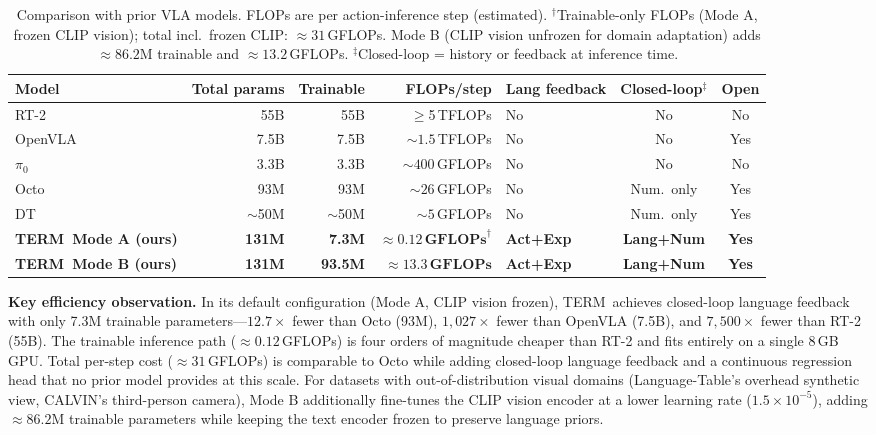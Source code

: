 \documentclass{article}
\newcommand{\modelname}{\textsc{TERM}\xspace}
\begin{document}
\begin{table}[h]
\centering
\caption{Comparison with prior VLA models.
  FLOPs are per action-inference step (estimated).
  $^\dagger$Trainable-only FLOPs (Mode A, frozen CLIP vision); total incl.\ frozen CLIP: ${\approx}31$\,GFLOPs.
  Mode B (CLIP vision unfrozen for domain adaptation) adds ${\approx}86.2$M trainable and ${\approx}13.2$\,GFLOPs.
  $^\ddagger$Closed-loop = history or feedback at inference time.}
\label{tab:comparison}
\small
\setlength{\tabcolsep}{4pt}
\begin{tabular}{lrrrlcc}
\toprule
\textbf{Model} & \textbf{Total params} & \textbf{Trainable} & \textbf{FLOPs/step}
               & \textbf{Lang feedback} & \textbf{Closed-loop$^\ddagger$} & \textbf{Open} \\
\midrule
RT-2~\citep{brohan2023rt2}     & 55B  & 55B   & $\ge$5\,TFLOPs   & No  & No          & No  \\
OpenVLA~\citep{kim2024openvla} & 7.5B & 7.5B  & ${\sim}1.5$\,TFLOPs & No & No        & Yes \\
$\pi_0$~\citep{black2024pi0}   & 3.3B & 3.3B  & ${\sim}400$\,GFLOPs & No & No        & No  \\
Octo~\citep{octo2024}          & 93M  & 93M   & ${\sim}26$\,GFLOPs  & No & Num.\ only & Yes \\
DT~\citep{chen2021decision}    & ${\sim}$50M & ${\sim}$50M & ${\sim}5$\,GFLOPs & No & Num.\ only & Yes \\
\midrule
\textbf{\modelname\ Mode A (ours)} & \textbf{131M} & \textbf{7.3M}
                               & $\mathbf{{\approx}0.12\,\text{GFLOPs}}^\dagger$
                               & \textbf{Act+Exp} & \textbf{Lang+Num} & \textbf{Yes} \\
\textbf{\modelname\ Mode B (ours)} & \textbf{131M} & \textbf{93.5M}
                               & $\mathbf{{\approx}13.3\,\text{GFLOPs}}$
                               & \textbf{Act+Exp} & \textbf{Lang+Num} & \textbf{Yes} \\
\bottomrule
\end{tabular}
\end{table}

\noindent\textbf{Key efficiency observation.}
In its default configuration (Mode A, CLIP vision frozen), \modelname\ achieves
closed-loop language feedback with only 7.3M trainable parameters---$12.7\times$
fewer than Octo (93M), $1{,}027\times$ fewer than OpenVLA (7.5B), and
$7{,}500\times$ fewer than RT-2 (55B).
The trainable inference path (${\approx}0.12$\,GFLOPs) is four orders of
magnitude cheaper than RT-2 and fits entirely on a single 8\,GB GPU.
Total per-step cost (${\approx}31$\,GFLOPs) is comparable to Octo while adding
closed-loop language feedback and a continuous regression head that no prior
model provides at this scale.
For datasets with out-of-distribution visual domains (Language-Table's
overhead synthetic view, CALVIN's third-person camera), Mode B additionally
fine-tunes the CLIP vision encoder at a lower learning rate ($1.5\!\times\!10^{-5}$),
adding ${\approx}86.2$M trainable parameters while keeping the text encoder frozen
to preserve language priors.
\end{document}
